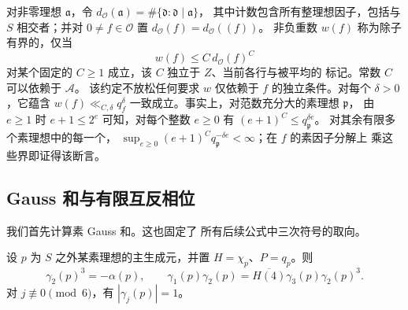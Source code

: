 对非零理想 $\mathfrak a$，令
$d_{\mathcal O}(\mathfrak a)=\#\{\mathfrak d:\mathfrak d\mid\mathfrak a\}$，
其中计数包含所有整理想因子，包括与
$S$ 相交者；并对 $0\ne f\in\mathcal O$ 置
$d_{\mathcal O}(f)=d_{\mathcal O}((f))$。
非负重数 $w(f)$ 称为除子有界的，仅当
\[
 w(f)\le C\,d_{\mathcal O}(f)^C
\]
对某个固定的 $C\ge1$ 成立，该 $C$ 独立于 $Z$、当前各行与被平均的
标记。常数 $C$ 可以依赖于 $\mathcal A$。
该约定不放松任何要求 $w$ 仅依赖于
$f$ 的独立条件。对每个 $\delta>0$，它蕴含 $w(f)\ll_{C,\delta}q_f^\delta$
一致成立。事实上，对范数充分大的素理想 $\mathfrak p$，
由 $e\ge1$ 时 $e+1\le2^e$ 可知，对每个整数 $e\ge0$ 有 $(e+1)^C\le q_{\mathfrak p}^{\delta e}$。
对其余有限多个素理想中的每一个，
$\sup_{e\ge0}(e+1)^Cq_{\mathfrak p}^{-\delta e}<\infty$；在 $f$ 的素因子分解上
乘这些界即证得该断言。

\subsection{Gauss 和与有限互反相位}

我们首先计算素 Gauss 和。这也固定了
所有后续公式中三次符号的取向。

\begin{lemma}\label{lem:prime-gauss-identities}
设 $p$ 为 $S$ 之外某素理想的主生成元，并置
$H=\chi_p$、$P=q_p$。则
\[
 \gamma_2(p)^3=-\alpha(p),\qquad
 \gamma_1(p)\gamma_2(p)
   =\overline{H(4)}\gamma_3(p)\gamma_2(p)^3.
\]
对 $j\not\equiv0\pmod6$，有 $|\gamma_j(p)|=1$。
\end{lemma}


